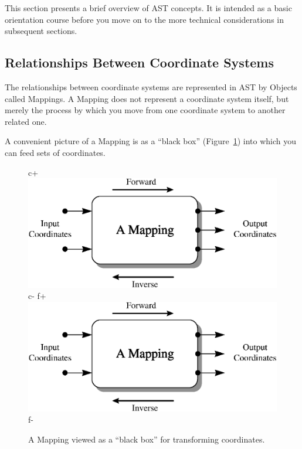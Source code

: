 \documentclass[twoside,11pt]{article}
\newenvironment{latexonly}{}{}
\begin{document}
This section presents a brief overview of AST concepts. It is intended
as a basic orientation course before you move on to the more technical
considerations in subsequent sections.

\subsection{\label{ss:mappingoverview}Relationships Between Coordinate Systems}

The relationships between coordinate systems are represented in AST by
Objects called Mappings. A Mapping does not represent a coordinate
system itself, but merely the process by which you move from one
coordinate system to another related one.
 
\begin{latexonly}
   A convenient picture of a Mapping is as a ``black box''
   (Figure~\ref{fig:mapping}) into which you can feed sets of
   coordinates.
   \begin{figure}[bhtp]
   \begin{center}
c+
   \includegraphics[scale=0.7]{sun211_figures/mapping.eps}
c-
f+
   \includegraphics[scale=0.7]{sun210_figures/mapping.eps}
f-
   \caption{A Mapping viewed as a ``black box'' for transforming coordinates.}
   \label{fig:mapping}
   \end{center}
   \end{figure}
\end{latexonly}
\end{document}
